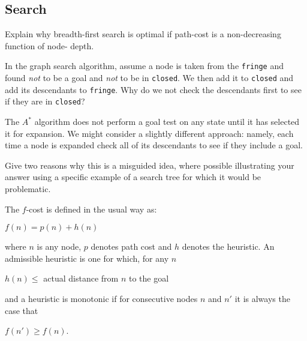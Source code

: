 \documentclass{supervision}
\begin{document}
  \begin{questions}
    \section*{Search}
    \question Explain why breadth-first search is optimal if path-cost is a
      non-decreasing function of node- depth.

    \question In the graph search algorithm, assume a node is taken from the
      \lstinline|fringe| and found \textit{not} to be a goal and \textit{not} to
      be in \lstinline|closed|. We then add it to \lstinline|closed| and add its
      descendants to \lstinline|fringe|. Why do we not check the descendants
      first to see if they are in \lstinline|closed|?

    \question The $A^*$ algorithm does not perform a goal test on any state
      until it has selected it for expansion. We might consider a slightly
      different approach: namely, each time a node is expanded check all of its
      descendants to see if they include a goal.

      Give two reasons why this is a misguided idea, where possible illustrating
      your answer using a specific example of a search tree for which it would
      be problematic.

    \question The $f$-cost is defined in the usual way as:
      \begin{center}
        $f(n) = p(n) + h(n)$
      \end{center}

      where $n$ is any node, $p$ denotes path cost and $h$ denotes the
      heuristic. An admissible heuristic is one for which, for any $n$

      \begin{center}
        $h(n) \leq$ actual distance from $n$ to the goal
      \end{center}

      and a heuristic is monotonic if for consecutive nodes $n$ and $n'$ it is
      always the case that

      \begin{center}
        $f(n') \geq f(n)$.
      \end{center}

\end{questions}
\end{document}
